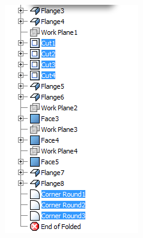 \begin{minipage}{\linewidth}
\begin{minipage}[c]{0.3\linewidth}
\includegraphics[width=\linewidth,valign=t]{../Common/images/CommercialBracket_PhI_tree}
 \label{fig:results:CommercialBracket_PhItree}
\end{minipage}
\end{minipage}



%
%
%


